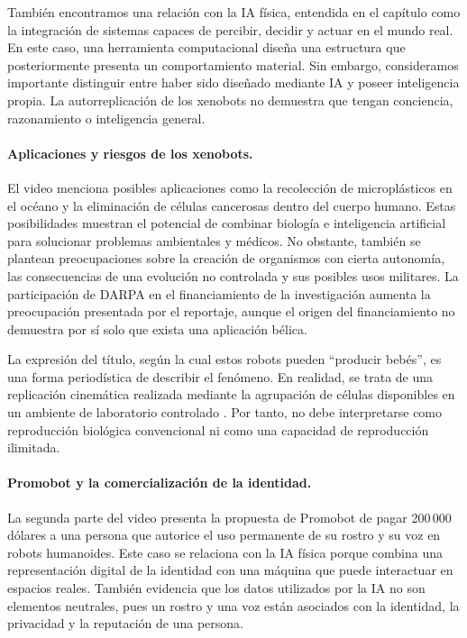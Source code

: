 \documentclass[14pt,twoside]{article}
\begin{document}
También encontramos una relación con la IA física, entendida en el capítulo como la integración de sistemas capaces de percibir, decidir y actuar en el mundo real. En este caso, una herramienta computacional diseña una estructura que posteriormente presenta un comportamiento material. Sin embargo, consideramos importante distinguir entre haber sido diseñado mediante IA y poseer inteligencia propia. La autorreplicación de los xenobots no demuestra que tengan conciencia, razonamiento o inteligencia general.

\paragraph{Aplicaciones y riesgos de los xenobots.}

El video menciona posibles aplicaciones como la recolección de microplásticos en el océano y la eliminación de células cancerosas dentro del cuerpo humano. Estas posibilidades muestran el potencial de combinar biología e inteligencia artificial para solucionar problemas ambientales y médicos. No obstante, también se plantean preocupaciones sobre la creación de organismos con cierta autonomía, las consecuencias de una evolución no controlada y sus posibles usos militares. La participación de DARPA en el financiamiento de la investigación aumenta la preocupación presentada por el reportaje, aunque el origen del financiamiento no demuestra por sí solo que exista una aplicación bélica.

La expresión del título, según la cual estos robots pueden ``producir bebés'', es una forma periodística de describir el fenómeno. En realidad, se trata de una replicación cinemática realizada mediante la agrupación de células disponibles en un ambiente de laboratorio controlado \cite{wyss2021}. Por tanto, no debe interpretarse como reproducción biológica convencional ni como una capacidad de reproducción ilimitada.

\paragraph{Promobot y la comercialización de la identidad.}

La segunda parte del video presenta la propuesta de Promobot de pagar 200\,000 dólares a una persona que autorice el uso permanente de su rostro y su voz en robots humanoides. Este caso se relaciona con la IA física porque combina una representación digital de la identidad con una máquina que puede interactuar en espacios reales. También evidencia que los datos utilizados por la IA no son elementos neutrales, pues un rostro y una voz están asociados con la identidad, la privacidad y la reputación de una persona.
\end{document}
